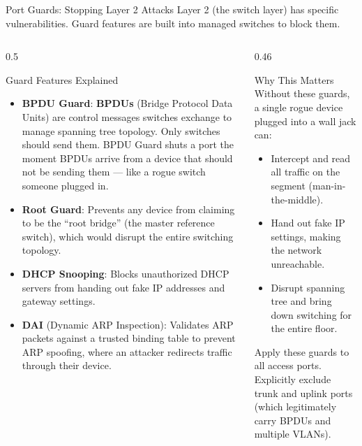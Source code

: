 \documentclass[aspectratio=169]{beamer}  %
\begin{document}
\begin{frame}{Port Guards: Stopping Layer 2 Attacks}
    \footnotesize
    Layer 2 (the switch layer) has specific vulnerabilities. Guard features are built into managed switches to block them.

    \vspace{0.3em}
    \begin{columns}[T]
        \begin{column}{0.5\textwidth}
            \begin{block}{Guard Features Explained}
                \footnotesize
                \begin{itemize}
                    \item \textbf{BPDU Guard}: \textbf{BPDUs} (Bridge Protocol Data Units) are control messages switches exchange to manage spanning tree topology. Only switches should send them. BPDU Guard shuts a port the moment BPDUs arrive from a device that should not be sending them --- like a rogue switch someone plugged in.
                    \item \textbf{Root Guard}: Prevents any device from claiming to be the ``root bridge'' (the master reference switch), which would disrupt the entire switching topology.
                    \item \textbf{DHCP Snooping}: Blocks unauthorized DHCP servers from handing out fake IP addresses and gateway settings.
                    \item \textbf{DAI} (Dynamic ARP Inspection): Validates ARP packets against a trusted binding table to prevent ARP spoofing, where an attacker redirects traffic through their device.
                \end{itemize}
            \end{block}
        \end{column}
        \begin{column}{0.46\textwidth}
            \begin{alertblock}{Why This Matters}
                \footnotesize
                Without these guards, a single rogue device plugged into a wall jack can:
                \begin{itemize}
                    \item Intercept and read all traffic on the segment (man-in-the-middle).
                    \item Hand out fake IP settings, making the network unreachable.
                    \item Disrupt spanning tree and bring down switching for the entire floor.
                \end{itemize}
            \end{alertblock}
            \vspace{0.2em}
            \footnotesize
            Apply these guards to all access ports. Explicitly exclude trunk and uplink ports (which legitimately carry BPDUs and multiple VLANs).
        \end{column}
    \end{columns}
\end{frame}
\end{document}
